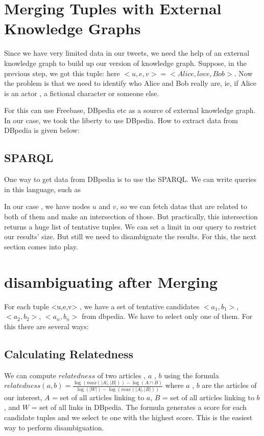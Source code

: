\section{ Merging Tuples with External Knowledge Graphs }
Since we have very limited data in our tweets, we need the help of an external knowledge graph to build 
up our version of knowledge graph. Suppose, in the previous step, we got this tuple:  here $<u, e, v> = <Alice, love, Bob>$.
Now the problem is that we need to identify who Alice and Bob really are, ie, if Alice is an actor , a fictional character or someone else.

For this can use Freebase, DBpedia etc as a source of external knowledge graph.
In our case, we took the liberty to use DBpedia. How to extract data from DBpedia is given below: 
\subsection{SPARQL}
One way to get data from DBpedia is to use the SPARQL. We can write queries in this language, such as 

In our case , we have nodes $ u $ and $ v $, so we can fetch datas that are related to both of them and make an intersection of those. 
But practically, this intersection returns a huge list of tentative tuples.  We can set a limit in our query to 
restrict our results' size. But still we need to disambiguate the results. For this, the next section comes into play.

\section{ disambiguating after Merging }
For each tuple <u,e,v> , we have a set of tentative candidates $<a_1, b_1>$, $<a_2, b_2>$, $<a_n, b_n>$ from dbpedia. 
We have to select only one of them. For this there are several ways:
\subsection{Calculating Relatedness}
 We can compute $ relatedness $ of two articles , $a$ , $b$ using the formula 
  $ relatedness(a,b) = \frac{\log(max(|A|, |B|)) - \log(A \cap B) }{ \log( |W| ) - \log(max(|A|, |B|)) } $
where $a$ , $b$ are the articles of our interest, $A$  = set of all articles linking to $a$, $B$ = set of all articles linking to $b$, 
and $W$ = set of all links in DBpedia. The formula generates a score for each candidate tuples and we select te one with the highest score.
This is the easiest way to perform disambiguation.   

